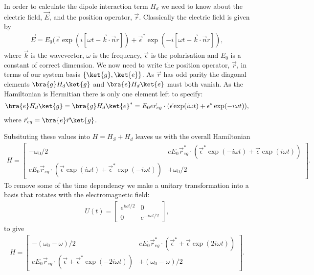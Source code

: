 In order to calculate the dipole interaction term $H_d$ we need to know about the electric field, $\vec{E}$, and the position operator, $\vec{r}$. Classically the electric field is given by
\begin{align}
  \vec{E} = E_0 (\vec{\epsilon}\exp(i[\omega t - \vec{k}\cdot\vec{n}r]) + \vec{\epsilon}^*\exp(-i[\omega t - \vec{k}\cdot\vec{n}r]),
\end{align}
where $\vec{k}$ is the wavevector, $\omega$ is the frequency, $\vec{\epsilon}$ is the polarisation and $E_0$ is a constant of correct dimension.  We now need to write the position operator, $\vec{r}$, in terms of our system basis $\{\ket{g}, \ket{e}\}$. As $\vec{r}$ has odd parity the diagonal elements $\bra{g}H_d\ket{g}$ and $\bra{e}H_d\ket{e}$ must both vanish. As the Hamiltonian is Hermitian there is only one element left to specify:
\begin{align}
  \bra{e}H_d\ket{g} = \bra{g}H_d\ket{e}^* = E_0e\vec{r}_{eg}\cdot(\vec{\epsilon}\exp(i\omega t) + \vec{\epsilon}^*\exp(-i\omega t)),
\end{align}
where $\vec{r}_{eg} = \bra{e}\vec{r}\ket{g}$.

Subsituting these values into $H = H_S + H_d$ leaves us with the overall Hamiltonian
\begin{align}
  H =
  \begin{bmatrix}
    -\omega_0/2 & eE_0\vec{r}_{eg}^*\cdot(\vec{\epsilon}^*\exp(-i\omega t) + \vec{\epsilon}\exp(i\omega t)) \\
    eE_0\vec{r}_{eg}\cdot(\vec{\epsilon}\exp(i\omega t) + \vec{\epsilon}^*\exp(-i\omega t)) & +\omega_0/2
  \end{bmatrix}.
\end{align}
To remove some of the time dependency we make a unitary transformation into a basis that rotates with the electromagnetic field:
\begin{align}
  U(t) =
  \begin{bmatrix}
    e^{i\omega t/2} & 0 \\
    0 & e^{-i\omega t/2}
  \end{bmatrix},
\end{align}
to give
\begin{align}
  H =
  \begin{bmatrix}
    -(\omega_0-\omega)/2 & eE_0\vec{r}_{eg}^*\cdot(\vec{\epsilon}^* + \vec{\epsilon}\exp(2i\omega t)) \\
    eE_0\vec{r}_{eg}\cdot(\vec{\epsilon} + \vec{\epsilon}^*\exp(-2i\omega t)) & +(\omega_0-\omega)/2
  \end{bmatrix}.
\end{align}

